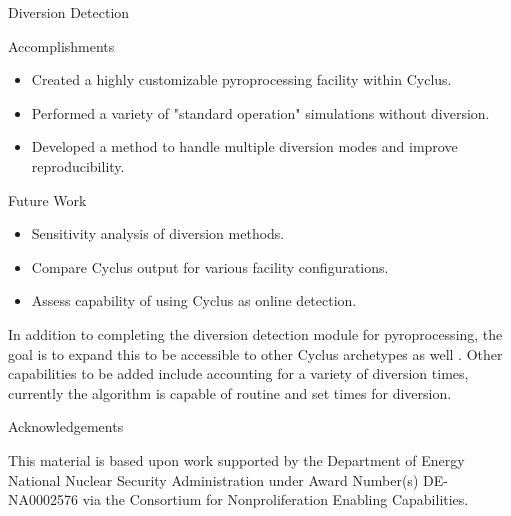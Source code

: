 \documentclass[final]{beamer}
\newlength{\onecolwid}
\newlength{\threecolwid}
\begin{document}
\begin{frame}[t]
\begin{columns}[t,totalwidth=\threecolwid]
\begin{column}{\onecolwid}
\begin{block}{Diversion Detection}
\end{block}
\begin{block}{Accomplishments}
	\begin{itemize}
		\item Created a highly customizable pyroprocessing facility within Cyclus.
		\item Performed a variety of "standard operation" simulations without diversion.
		\item Developed a method to handle multiple diversion modes and improve reproducibility.
	\end{itemize}
\end{block}

\begin{alertblock}{Future Work}
	\begin{itemize}
		\item Sensitivity analysis of diversion methods.
		\item Compare Cyclus output for various facility configurations.
		\item Assess capability of using Cyclus as online detection.
	\end{itemize} 
	\vspace{10mm}
	In addition to completing the diversion detection module for pyroprocessing, the goal is to expand this to be accessible to
	other Cyclus archetypes as well \cite{Huff_2016}. Other capabilities to be added include accounting for a variety of diversion times,
	currently the algorithm is capable of routine and set times for diversion.
\end{alertblock}



\begin{block}{Acknowledgements}
	
	This material is based upon work supported by
	the Department of Energy National Nuclear Security
	Administration under Award Number(s) DE-NA0002576 via
	the Consortium for Nonproliferation Enabling Capabilities.
	

\end{block}
\end{column}
\end{columns}
\end{frame}
\end{document}
